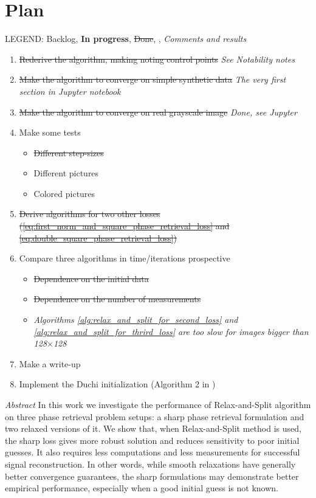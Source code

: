 \documentclass[11pt,letterpaper]{article}
\numberwithin{equation}{section} %
\numberwithin{figure}{section} %
\numberwithin{table}{section} %
\begin{document}
\section*{Plan}
LEGEND: Backlog, \textbf{In progress}, \sout{Done}, , \textit{Comments and results}
\begin{enumerate}
    \item \sout{Rederive the algorithm, making noting control points} \textit{See Notability notes}
    \item \sout{Make the algorithm to converge on simple synthetic data} \textit{The very first section in Jupyter notebook}
    \item \sout{Make the algorithm to converge on real grayscale image} \textit{Done, see Jupyter}
    \item Make some tests
    \begin{itemize}
        \item \sout{Different step-sizes}
        \item Different pictures
        \item Colored pictures
    \end{itemize}
    \item \sout{Derive algorithms for two other losses (\ref{eq:first_norm_and_square_phase_retrieval_loss} and \ref{eq:double_square_phase_retrieval_loss})}
    \item Compare three algorithms in time/iterations prospective
    \begin{itemize}
        \item \sout{Dependence on the initial data} 
        \item \sout{Dependence on the number of measurements}
        \item {} \textit{Algorithms \ref{alg:relax_and_split_for_second_loss} and \ref{alg:relax_and_split_for_thrird_loss} are too slow for images bigger than 128$\times$128}
    \end{itemize}
    \item Make a write-up
    \item Implement the Duchi initialization (Algorithm 2 in \cite{Duchi2017PhaseRetrival})
\end{enumerate}

\listoftodos

\newpage

\textit{Abstract} In this work we investigate the performance of Relax-and-Split algorithm on three phase retrieval problem setups: a sharp phase retrieval formulation and two relaxed versions of it. We show that, when Relax-and-Split method is used, the sharp loss gives more robust solution and reduces sensitivity to poor initial guesses. It also requires less computations and less measurements for successful signal reconstruction. In other words, while smooth relaxations have generally better convergence guarantees, the sharp formulations may demonstrate better empirical performance, especially when a good initial guess is not known.  
\end{document}
